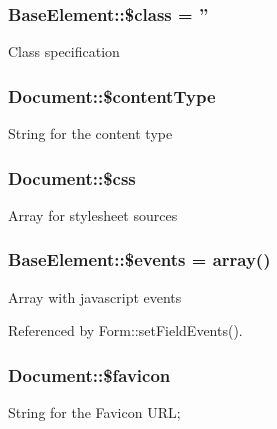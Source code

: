 \subsubsection[{\$class}]{\setlength{\rightskip}{0pt plus 5cm}BaseElement::\$class = ''}\label{classBaseElement_a99976a8e967db92e7800309f359b0803}
Class specification 
\subsubsection[{\$contentType}]{\setlength{\rightskip}{0pt plus 5cm}Document::\$contentType}\label{classDocument_ab1cd325e8c6dc65ec0512e759d120b0e}
String for the content type 
\subsubsection[{\$css}]{\setlength{\rightskip}{0pt plus 5cm}Document::\$css}\label{classDocument_a635d9d19a754911129ac92e8b00f4f31}
Array for stylesheet sources 
\subsubsection[{\$events}]{\setlength{\rightskip}{0pt plus 5cm}BaseElement::\$events = array()}\label{classBaseElement_a02cebe45d277b4ff8f29db08bad371ba}
Array with javascript events 

Referenced by Form::setFieldEvents().

\subsubsection[{\$favicon}]{\setlength{\rightskip}{0pt plus 5cm}Document::\$favicon}\label{classDocument_ad74353c065d3fe06667bc549ed0977e7}
String for the Favicon URL; 
